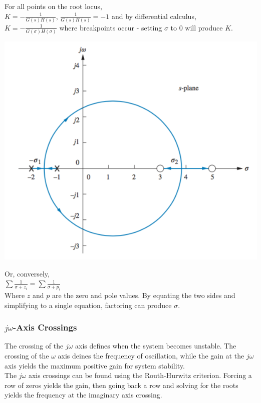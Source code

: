 \documentclass[11pt]{article}
\begin{document}
    For all points on the root locus, \\
    
    $K = -\frac{1}{G(s)H(s)}$, $\frac{1}{G(s)H(s)} = -1$ and by differential calculus, \\
    
    $K = -\frac{1}{G(\sigma)H(\sigma)}$ where breakpoints occur - setting $\sigma$ to 0 will produce $K$.

    \begin{center}
        \includegraphics[width=300 px]{img/breakpoints} \\
    \end{center}

    Or, conversely, \\

    $\sum \frac{1}{\sigma + z_i} = \sum \frac{1}{\sigma + p_i}$ \\

    Where $z$ and $p$ are the zero and pole values. By equating the two sides and simplifying to a single equation, factoring can produce $\sigma$.

    \subsubsection{$j\omega$-Axis Crossings}

    The crossing of the $j\omega$ axis defines when the system becomes unstable. The crossing of the $\omega$ axis deines the frequency of oscillation, while the gain at the $j\omega$ axis yields the maximum positive gain for system stability. \\ 

    The $j\omega$ axis crossings can be found using the Routh-Hurwitz criterion. Forcing a row of zeros yields the gain, then going back a row and solving for the roots yields the frequency at the imaginary axis crossing.
\end{document}
